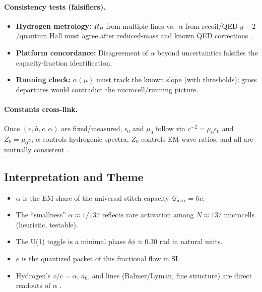 \documentclass[11pt,oneside]{article}
\begin{document}
\paragraph{Consistency tests (falsifiers).}
\begin{itemize}
  \item \textbf{Hydrogen metrology:} $R_H$ from multiple lines vs.\ $\alpha$ from recoil/QED \(g\!-\!2\)/quantum Hall must agree after reduced-mass and known QED corrections \cite{griffiths2018quantum,tiesinga2021codata}.
  \item \textbf{Platform concordance:} Disagreement of $\alpha$ beyond uncertainties falsifies the capacity-fraction identification.
  \item \textbf{Running check:} $\alpha(\mu)$ must track the known slope (with thresholds); gross departures would contradict the microcell/running picture.
\end{itemize}

\paragraph{Constants cross-link.}
Once $(e,h,c,\alpha)$ are fixed/measured, $\epsilon_0$ and $\mu_0$ follow via $c^{-2}=\mu_0\epsilon_0$ and $Z_0=\mu_0 c$; $\alpha$ controls hydrogenic spectra, $Z_0$ controls EM wave ratios, and all are mutually consistent \cite{bipm2019si,tiesinga2021codata}.

\subsection*{Interpretation and Theme}
\begin{itemize}
  \item $\alpha$ is the EM share of the universal stitch capacity $\mathcal Q_{\max}=\hbar c$.
  \item The ``smallness'' $\alpha\!\approx\!1/137$ reflects rare activation among $N\!\approx\!137$ microcells (heuristic, testable).
  \item The U(1) toggle is a minimal phase $\delta\phi\!\approx\!0.30$ rad in natural units.
  \item $e$ is the quantized packet of this fractional flow in SI.
  \item Hydrogen's $v/c=\alpha$, $a_0$, and lines (Balmer/Lyman, fine structure) are direct readouts of $\alpha$ \cite{bohr1913constitution,griffiths2018quantum}.
\end{itemize}
\end{document}
